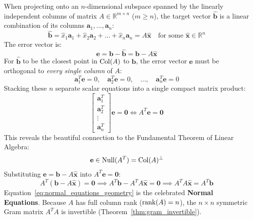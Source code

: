 When projecting onto an $n$-dimensional subspace spanned by the linearly independent columns of matrix $A \in \mathbb{R}^{m \times n}$ ($m \ge n$), the target vector $\hat{\mathbf{b}}$ is a linear combination of its columns $\mathbf{a}_1, \dots, \mathbf{a}_n$:
\begin{equation}
\hat{\mathbf{b}} = \hat{x}_1 \mathbf{a}_1 + \hat{x}_2 \mathbf{a}_2 + \dots + \hat{x}_n \mathbf{a}_n = A\hat{\mathbf{x}} \quad \text{for some } \hat{\mathbf{x}} \in \mathbb{R}^n
\end{equation}
The error vector is:
\begin{equation}
\mathbf{e} = \mathbf{b} - \hat{\mathbf{b}} = \mathbf{b} - A\hat{\mathbf{x}}
\end{equation}
For $\hat{\mathbf{b}}$ to be the closest point in $\operatorname{Col}(A)$ to $\mathbf{b}$, the error vector $\mathbf{e}$ must be orthogonal to \emph{every single column} of $A$:
\begin{equation}
\mathbf{a}_1^T \mathbf{e} = 0, \quad \mathbf{a}_2^T \mathbf{e} = 0, \quad \dots, \quad \mathbf{a}_n^T \mathbf{e} = 0
\end{equation}
Stacking these $n$ separate scalar equations into a single compact matrix product:
\begin{equation}
\begin{bmatrix} \mathbf{a}_1^T \\ \mathbf{a}_2^T \\ \vdots \\ \mathbf{a}_n^T \end{bmatrix} \mathbf{e} = \mathbf{0} \iff A^T \mathbf{e} = \mathbf{0}
\end{equation}
This reveals the beautiful connection to the Fundamental Theorem of Linear Algebra:
\begin{equation}
\mathbf{e} \in \operatorname{Null}(A^T) = \operatorname{Col}(A)^\perp
\end{equation}
Substituting $\mathbf{e} = \mathbf{b} - A\hat{\mathbf{x}}$ into $A^T \mathbf{e} = \mathbf{0}$:
\begin{equation}
A^T (\mathbf{b} - A\hat{\mathbf{x}}) = \mathbf{0} \implies A^T \mathbf{b} - A^T A \hat{\mathbf{x}} = \mathbf{0} \implies A^T A \hat{\mathbf{x}} = A^T \mathbf{b}
\label{eq:normal_equations_geometry}
\end{equation}
Equation~\eqref{eq:normal_equations_geometry} is the celebrated \textbf{Normal Equations}. Because $A$ has full column rank ($\operatorname{rank}(A) = n$), the $n \times n$ symmetric Gram matrix $A^T A$ is invertible (Theorem~\ref{thm:gram_invertible}). 


